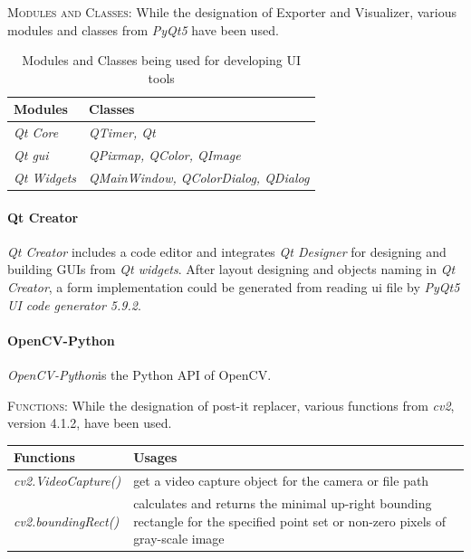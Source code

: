 \documentclass[a4paper, twoside]{report}
\begin{document}
\newpage
\noindent \textsc{Modules and Classes: } While the designation of Exporter and Visualizer, various modules and classes from \textit{PyQt5} have been used.   \\ \par
{\renewcommand{\arraystretch}{1.5}%
\begin{table}[h!]
\centering
\begin{tabular}{ m{2cm}| m{}  }
Modules & Classes \\
\hline
\textit{Qt Core} &\textit{QTimer, Qt} \\
\hline
\textit{Qt gui} &\textit{QPixmap, QColor, QImage } \\
\hline
\textit{Qt Widgets} & \textit{QMainWindow, QColorDialog, QDialog} \\
\end{tabular}
\caption{Modules and Classes being used for developing UI tools}
\end{table} \quad

\paragraph{Qt Creator}
\textit{Qt Creator} includes a code editor and integrates \textit{Qt Designer} for designing and building GUIs from \textit{Qt widgets}. After layout designing and objects naming in \textit{Qt Creator}, a form implementation could be generated from reading ui file by \textit{PyQt5 UI code generator 5.9.2}. \\ \par



\paragraph{OpenCV-Python}
\textit{OpenCV-Python}is the Python API of OpenCV. \\ \par

\noindent \textsc{Functions: } While the designation of post-it replacer, various functions from \textit{cv2}, version 4.1.2, have been used.   \\ \par
{\renewcommand{\arraystretch}{1.5}%
\begin{table}[h!]
\centering
\begin{tabular}{ m{5cm}| m{}  }
Functions & Usages \\
\hline
\textit{cv2.VideoCapture()} & get a video capture object for the camera or file path\\
\hline
\textit{cv2.boundingRect()} &calculates and returns the minimal up-right bounding rectangle for the specified point set or non-zero pixels of gray-scale image \\
\hline


\end{tabular}
\end{table}}}
\end{document}
